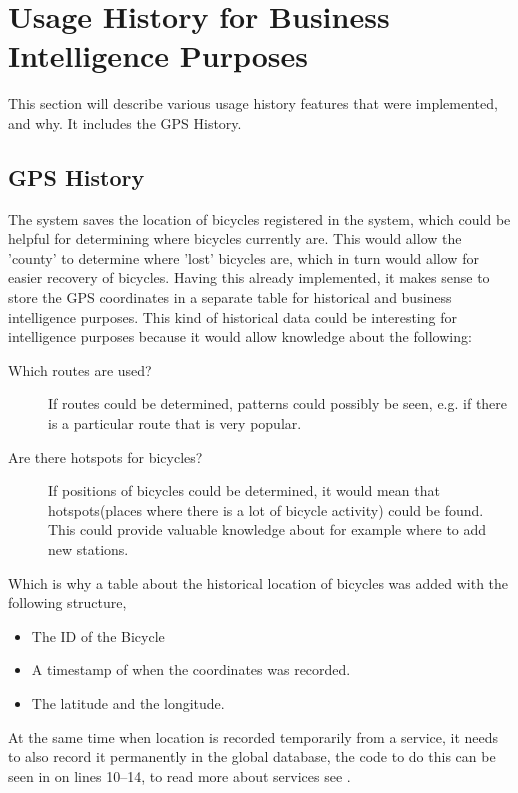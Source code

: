 \section{Usage History for Business Intelligence Purposes}
This section will describe various usage history features that were implemented, and why. It includes the GPS History.

\subsection{GPS History}
The system saves the location of bicycles registered in the system, which could be helpful for determining where bicycles currently are. 
This would allow the 'county' to determine where 'lost' bicycles are, which in turn would allow for easier recovery of bicycles.
Having this already implemented, it makes sense to store the GPS coordinates in a separate table for historical and business intelligence purposes.
This kind of historical data could be interesting for intelligence purposes because it would allow knowledge about the following:

\begin{description}
\item[Which routes are used?] If routes could be determined, patterns could possibly be seen, e.g. if there is a particular route that is very popular.
\item[Are there hotspots for bicycles?] If positions of bicycles could be determined, it would mean that hotspots(places where there is a lot of bicycle activity) could be found. This could provide valuable knowledge about for example where to add new stations.
\end{description}

Which is why a table about the historical location of bicycles was added with the following structure,

\begin{itemize}
\item The ID of the Bicycle
\item A timestamp of when the coordinates was recorded.
\item The latitude and the longitude.
\end{itemize}


At the same time when location is recorded temporarily from a service, it needs to also record it permanently in the global database, the code to do this can be seen in  on lines 10--14, to read more about services see .

